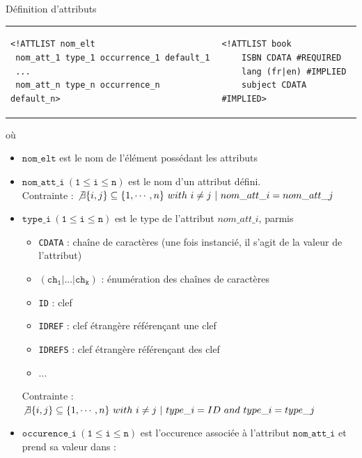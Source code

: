 \begin{frame}{Définition d'attributs}
\begin{tabular}{ll}
\begin{minipage}{0.55\textwidth}
\begin{small}
\begin{verbatim}
<!ATTLIST nom_elt
 nom_att_1 type_1 occurrence_1 default_1 
 ...
 nom_att_n type_n occurrence_n default_n> 
\end{verbatim}
\end{small}
\end{minipage}
&
\begin{minipage}{0.40\textwidth}
\begin{lstlisting}
<!ATTLIST book
    ISBN CDATA #REQUIRED 
    lang (fr|en) #IMPLIED
    subject CDATA #IMPLIED>
\end{lstlisting}
\end{minipage}\\
\end{tabular}
où\\
\begin{itemize}
\item $\mathtt{nom\_elt}$ est le nom de l'élément possédant les attributs 
\item $\mathtt{nom\_att\_i ~(1 \leq i \leq n)}$ est le nom d'un attribut défini. \\
  Contrainte : $\not \exists \{i,j\} \subseteq \{1,\cdots,n\} ~with~ i \neq j ~|~ nom\_att\_i  = nom\_att\_j$ 
\item $\mathtt{type\_i ~(1 \leq i \leq n)}$ est le type de l'attribut $nom\_att\_i$, parmis \\
  \begin{itemize}
  \item \texttt{CDATA} : cha\^ine de caractères (une fois instancié, il s'agit de la valeur de l'attribut)
  \item $\mathtt{(ch_1 | ... |ch_k)}$ : énumération des cha\^ines de caractères  
  \item \texttt{ID} : clef
  \item \texttt{IDREF} : clef étrangère référen\c{c}ant une clef
  \item \texttt{IDREFS} : clef étrangère référen\c{c}ant des clef 
 \item ...
  \end{itemize}
Contrainte : $\not \exists \{i,j\} \subseteq \{1,\cdots,n\} ~with~ i \neq j ~|~ type\_i  = ID ~and~  type\_i  = type\_j $ 
\item $\mathtt{occurence\_i ~(1 \leq i \leq n)}$ est l'occurence associée à l'attribut $\mathtt{nom\_att\_i}$ et prend sa valeur dans :

\end{itemize}
\end{frame}
